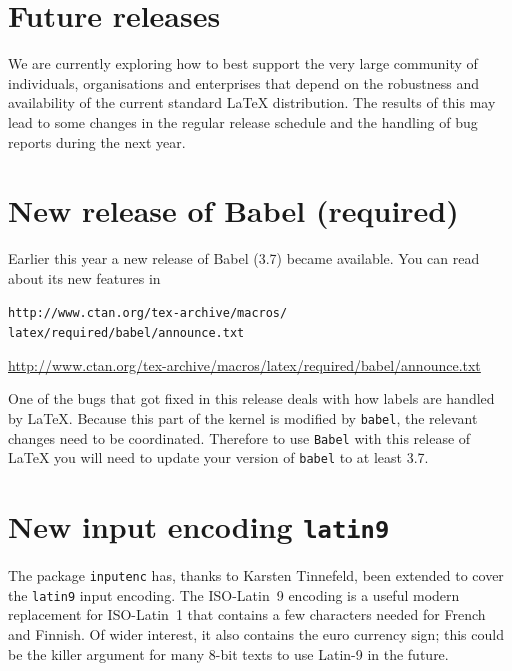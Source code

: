 \documentclass{ltnews}
\providecommand\pkg[1]{\texttt{#1}}
\providecommand\option[1]{\texttt{#1}}
\providecommand\file[1]{\texttt{#1}}
\begin{document}
\maketitle

\raisefirstsection
\section{Future releases}

We are currently exploring how to best support the very large
community of individuals, organisations and enterprises that depend on
the robustness and availability of the current standard \LaTeX{}
distribution.  The results of this may lead to some changes in the
regular release schedule and the handling of bug reports during the
next year.

\section{New release of \textsf{Babel} (required)}

Earlier this year a new release of \textsf{Babel} (3.7) became
available. You can read about its new features in
\begin{latexonly}
  \file{http://www.ctan.org/tex-archive/macros/}\\
  \hspace*{4em}\file{latex/required/babel/announce.txt}
\end{latexonly}
\begin{htmlonly}
  \url{http://www.ctan.org/tex-archive/macros/latex/required/babel/announce.txt}
\end{htmlonly}

One of the bugs that got fixed in this release deals with how labels
are handled by \LaTeX{}.  Because this part of the kernel is modified
by \pkg{babel}, the relevant changes need to be coordinated.
Therefore to use \pkg{Babel} with this release of \LaTeX{} you will
need to update your version of \pkg{babel} to at least 3.7.

\section{New input encoding \option{latin9}}

The package \pkg{inputenc} has, thanks to Karsten Tinnefeld, been
extended to cover the \option{latin9} input encoding.  The
ISO-Latin~9 encoding is a useful modern replacement for ISO-Latin~1
that contains a few characters needed for French and Finnish. Of wider
interest, it also contains the euro currency sign; this could be the
killer argument for many 8-bit texts to use Latin-9 in the future.
\end{document}
